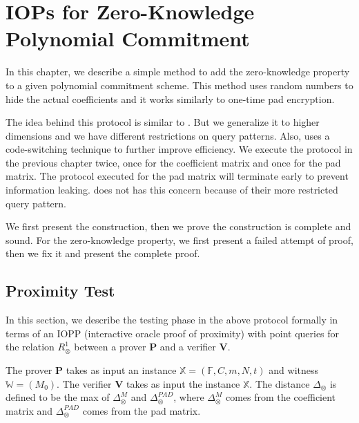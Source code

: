 \chapter{IOPs for Zero-Knowledge Polynomial Commitment}

In this chapter, we describe a simple method to add the zero-knowledge property to a given polynomial commitment scheme. This method uses random numbers to hide the actual coefficients and it works similarly to one-time pad encryption.

The idea behind this protocol is similar to \cite{orion}. But we generalize it to higher dimensions and we have different restrictions on query patterns. Also, \cite{orion} uses a code-switching technique to further improve efficiency. We execute the protocol in the previous chapter twice, once for the coefficient matrix and once for the pad matrix. The protocol executed for the pad matrix will terminate early to prevent information leaking. \cite{orion} does not has this concern because of their more restricted query pattern.

We first present the construction, then we prove the construction is complete and sound. For the zero-knowledge property, we first present a failed attempt of proof, then we fix it and present the complete proof.

\section{Proximity Test}

In this section, we describe the testing phase in the above protocol formally in terms of an IOPP (interactive oracle proof of proximity) with point queries for the relation $R_\otimes^1$ between a prover $\textbf{P}$ and a verifier $\textbf{V}$.

The prover $\textbf{P}$ takes as input an instance $\mathbb{X} = (\mathbb{F}, C, m, N, t)$ and witness $\mathbb{W} = (M_0)$. The verifier $\textbf{V}$ takes as input the instance $\mathbb{X}$. The distance $\Delta_\otimes$ is defined to be the max of $\Delta_\otimes^{M}$ and $\Delta_\otimes^{PAD}$, where $\Delta_\otimes^{M}$ comes from the coefficient matrix and $\Delta_\otimes^{PAD}$ comes from the pad matrix.


